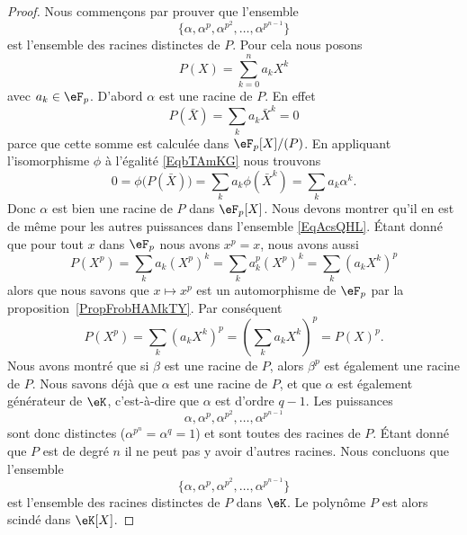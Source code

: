 \begin{proof}
    Nous commençons par prouver que l'ensemble
    \begin{equation}        \label{EqAcsQHL}
        \{ \alpha,\alpha^p,\alpha^{p^2},\ldots, \alpha^{p^{n-1}} \}
    \end{equation}
    est l'ensemble des racines distinctes de \( P\). Pour cela nous posons
    \begin{equation}
        P(X)=\sum_{k=0}^na_kX^k
    \end{equation}
    avec \( a_k\in\eF_p\). D'abord \( \alpha\) est une racine de \( P\). En effet
    \begin{equation}        \label{EqbTAmKG}
        P(\bar X)=\sum_ka_k\bar X^k=0
    \end{equation}
    parce que cette somme est calculée dans \( \eF_p[X]/(P)\). En appliquant l'isomorphisme \( \phi\) à l'égalité \eqref{EqbTAmKG} nous trouvons
    \begin{equation}
        0=\phi\big( P(\bar X) \big)=\sum_ka_k\phi(\bar X^k)=\sum_ka_k\alpha^k.
    \end{equation}
    Donc \( \alpha\) est bien une racine de \( P\) dans \( \eF_p[X]\). Nous devons montrer qu'il en est de même pour les autres puissances dans l'ensemble \eqref{EqAcsQHL}. Étant donné que pour tout \( x\) dans \( \eF_p\) nous avons \( x^p=x\), nous avons aussi
    \begin{equation}
        P(X^p)=\sum_ka_k(X^p)^k=\sum_ka_k^p(X^p)^k=\sum_k(a_kX^k)^p
    \end{equation}
    alors que nous savons que \( x\mapsto x^p\) est un automorphisme de \( \eF_p\) par la proposition~\ref{PropFrobHAMkTY}. Par conséquent
    \begin{equation}
        P(X^p)=\sum_k(a_kX^k)^p=\left( \sum_k a_kX^k\right)^p=P(X)^p.
    \end{equation}
    Nous avons montré que si \( \beta\) est une racine de \( P\), alors \( \beta^p\) est également une racine de \( P\). Nous savons déjà que \( \alpha\) est une racine de \( P\), et que \( \alpha\) est également générateur de \( \eK\), c'est-à-dire que \( \alpha\) est d'ordre \( q-1\). Les puissances
    \begin{equation}
        \alpha,\alpha^p,\alpha^{p^2},\ldots, \alpha^{p^{n-1}}
    \end{equation}
    sont donc distinctes (\( \alpha^{p^n}=\alpha^q=1\)) et sont toutes des racines de \( P\). Étant donné que \( P\) est de degré \( n\) il ne peut pas y avoir d'autres racines. Nous concluons que l'ensemble
    \begin{equation}
        \{ \alpha,\alpha^p,\alpha^{p^2},\ldots, \alpha^{p^{n-1}}\}
    \end{equation}
    est l'ensemble des racines distinctes de \( P\) dans \( \eK\). Le polynôme \( P\) est alors scindé dans \( \eK[X]\).


\end{proof}
